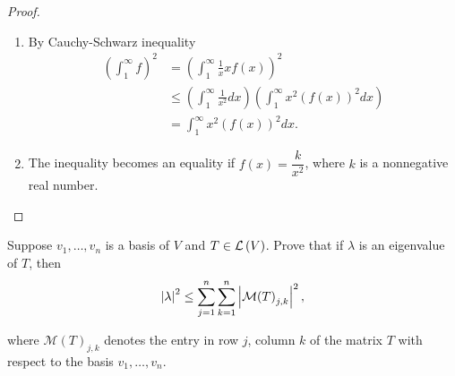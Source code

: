 \begin{proof}
    \begin{enumerate}[label={(\alph*)}]
        \item By Cauchy-Schwarz inequality
              \begin{align*}
                  {\left(\int^{\infty}_{1}f\right)}^{2} & = {\left(\int^{\infty}_{1}\frac{1}{x}xf(x)\right)}^{2}                                                           \\
                                                        & \leq \left(\int^{\infty}_{1}\frac{1}{x^{2}}dx\right)\left(\int^{\infty}_{1}x^{2}{\left(f(x)\right)}^{2}dx\right) \\
                                                        & = \int^{\infty}_{1}x^{2}{\left(f(x)\right)}^{2}dx.
              \end{align*}
        \item The inequality becomes an equality if $f(x) = \dfrac{k}{x^{2}}$, where $k$ is a nonnegative real number.
    \end{enumerate}
\end{proof}
\newpage

\begin{exercise}
    Suppose $v_{1}, \ldots, v_{n}$ is a basis of $V$ and $T\in\mathcal{L}\left({V}\right)$. Prove that if $\lambda$ is an eigenvalue of $T$, then
    \[
        \left\vert{\lambda}\right\vert^{2}\leq \sum^{n}_{j=1}\sum^{n}_{k=1}\left\vert{{\mathcal{M}(T)}_{j,k}}\right\vert^{2},
    \]

    where ${\mathcal{M}(T)}_{j,k}$ denotes the entry in row $j$, column $k$ of the matrix $T$ with respect to the basis $v_{1}, \ldots, v_{n}$.
\end{exercise}

